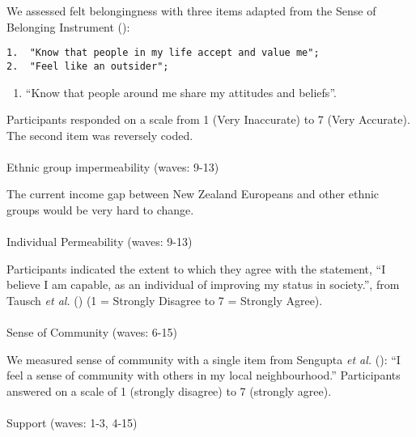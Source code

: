 \documentclass[
  singlecolumn,
  9pt]{scrartcl}
\makeatletter
\let\oldparagraph\paragraph
\renewcommand{\paragraph}{
    \@ifstar
      \xxxParagraphStar
      \xxxParagraphNoStar
  }
\newcommand{\xxxParagraphStar}[1]{\oldparagraph*{#1}\mbox{}}
\newcommand{\xxxParagraphNoStar}[1]{\oldparagraph{#1}\mbox{}}
\providecommand{\tightlist}{%
  \setlength{\itemsep}{0pt}\setlength{\parskip}{0pt}}\usepackage{longtable,booktabs,array}
\makeatother
\begin{document}
We assessed felt belongingness with three items adapted from the Sense
of Belonging Instrument ():

\begin{verbatim}
1.  "Know that people in my life accept and value me";
2.  "Feel like an outsider";
\end{verbatim}

\begin{enumerate}
\def\labelenumi{\arabic{enumi}.}
\setcounter{enumi}{2}
\tightlist
\item
  ``Know that people around me share my attitudes and beliefs''.
\end{enumerate}

Participants responded on a scale from 1 (Very Inaccurate) to 7 (Very
Accurate). The second item was reversely coded.

\paragraph{Ethnic group impermeability (waves:
9-13)}\label{ethnic-group-impermeability-waves-9-13}

The current income gap between New Zealand Europeans and other ethnic
groups would be very hard to change.

\paragraph{Individual Permeability (waves:
9-13)}\label{individual-permeability-waves-9-13}

Participants indicated the extent to which they agree with the
statement, ``I believe I am capable, as an individual of improving my
status in society.'', from Tausch \emph{et al.}
() (1 = Strongly Disagree to 7 = Strongly
Agree).

\paragraph{Sense of Community (waves:
6-15)}\label{sense-of-community-waves-6-15}

We measured sense of community with a single item from Sengupta \emph{et
al.} (): ``I feel a sense of community
with others in my local neighbourhood.'' Participants answered on a
scale of 1 (strongly disagree) to 7 (strongly agree).

\paragraph{Support (waves: 1-3, 4-15)}\label{support-waves-1-3-4-15}
\end{document}
